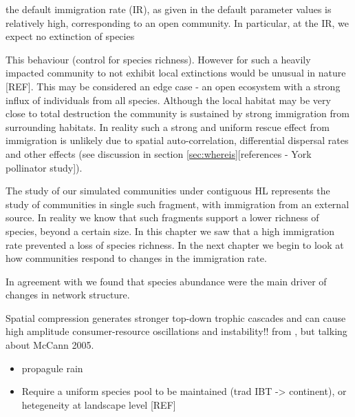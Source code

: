 the default immigration rate (IR), as given in the default parameter values  is relatively high, corresponding to an open community. In particular, at the IR, we expect no extinction of species

This behaviour  (control for species richness). However for such a heavily impacted community to not exhibit local extinctions would be unusual in nature [REF]. This may be considered an edge case - an open ecosystem with a strong influx of individuals from all species. Although the local habitat may be very close to total destruction the community is sustained by strong immigration from surrounding habitats. In reality such a strong and uniform rescue effect from immigration is unlikely due to spatial auto-correlation, differential dispersal rates and other effects (see discussion in section \ref{sec:whereis}[references - York pollinator study]).

The study of our simulated communities under contiguous HL represents the study of communities in single such fragment, with immigration from an external source. In reality we know that such fragments support a lower richness of species, beyond a certain size. In this chapter we saw that a high immigration rate prevented a loss of species richness. In the next chapter we begin to look at how communities respond to changes in the immigration rate.


In agreement with \cite{spiesman2013habitat} we found that species abundance were the main driver of changes in network structure.

Spatial compression generates stronger top-down trophic cascades and can cause high amplitude consumer-resource oscillations and instability!! from \cite{gonzalez2011disentangled}, but talking about McCann 2005.

\begin{itemize}
	\item propagule rain
	\item Require a uniform species pool to be maintained (trad IBT -> continent), or hetegeneity at landscape level [REF]
\end{itemize}

